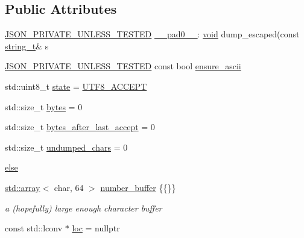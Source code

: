 \subsection*{Public Attributes}
\begin{DoxyCompactItemize}
\item 
\hyperlink{json_8hpp_a2cf645f34610e7f7d6e09ab88a2ab917}{J\+S\+O\+N\+\_\+\+P\+R\+I\+V\+A\+T\+E\+\_\+\+U\+N\+L\+E\+S\+S\+\_\+\+T\+E\+S\+T\+ED} \hyperlink{classnlohmann_1_1detail_1_1serializer_af15da74dab5b01150eabfed0be7d75df}{\+\_\+\+\_\+pad0\+\_\+\+\_\+}\+: \hyperlink{namespacenlohmann_1_1detail_a59fca69799f6b9e366710cb9043aa77d}{void} dump\+\_\+escaped(const \hyperlink{classnlohmann_1_1detail_1_1serializer_ad08aa54fac1dd0a453320c54137d45ba}{string\+\_\+t}\& s
\item 
\hyperlink{json_8hpp_a2cf645f34610e7f7d6e09ab88a2ab917}{J\+S\+O\+N\+\_\+\+P\+R\+I\+V\+A\+T\+E\+\_\+\+U\+N\+L\+E\+S\+S\+\_\+\+T\+E\+S\+T\+ED} const bool \hyperlink{classnlohmann_1_1detail_1_1serializer_ab4c340f2a5230f766a833366603a0049}{ensure\+\_\+ascii}
\item 
std\+::uint8\+\_\+t \hyperlink{classnlohmann_1_1detail_1_1serializer_a39b0975f219b542d7ca633652e925b4c}{state} = \hyperlink{classnlohmann_1_1detail_1_1serializer_a2311a8c756c4a119aa82cd55301d13bc}{U\+T\+F8\+\_\+\+A\+C\+C\+E\+PT}
\item 
std\+::size\+\_\+t \hyperlink{classnlohmann_1_1detail_1_1serializer_a4239a42672c7378a6b449ee010e6dace}{bytes} = 0
\item 
std\+::size\+\_\+t \hyperlink{classnlohmann_1_1detail_1_1serializer_a9ae3daaea1941fd02d4c3c1b0f5fbe68}{bytes\+\_\+after\+\_\+last\+\_\+accept} = 0
\item 
std\+::size\+\_\+t \hyperlink{classnlohmann_1_1detail_1_1serializer_a814f27bba20f0e109d0dbcaa4a399415}{undumped\+\_\+chars} = 0
\item 
\hyperlink{classnlohmann_1_1detail_1_1serializer_ae510f640d26ce0f7d5eb8191b31591c0}{else}
\item 
\hyperlink{namespacenlohmann_1_1detail_a1ed8fc6239da25abcaf681d30ace4985af1f713c9e000f5d3f280adbd124df4f5}{std\+::array}$<$ char, 64 $>$ \hyperlink{classnlohmann_1_1detail_1_1serializer_a1a9d8b344a6cb47728a3519693ec03d1}{number\+\_\+buffer} \{\{\}\}
\begin{DoxyCompactList}\small\item\em a (hopefully) large enough character buffer \end{DoxyCompactList}\item 
const std\+::lconv $\ast$ \hyperlink{classnlohmann_1_1detail_1_1serializer_a1952945b7652afb59d3903cc8457a589}{loc} = nullptr

\end{DoxyCompactItemize}
